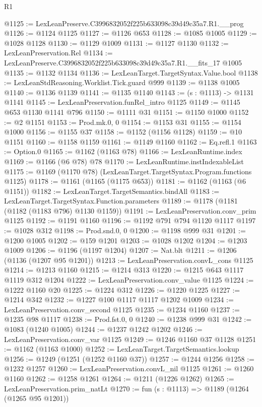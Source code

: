 \begin{lexlean}{R1}
\begin{coremodule}
@1125 := LexLeanPreserve.C3996832052f225b633098c39d49c35a7.R1.__prog
@1126 := @1124 @1125
@1127 := @1126 @653
@1128 := @1085 @1005
@1129 := @1028 @1128
@1130 := @1129 @1009
@1131 := @1127 @1130
@1132 := LexLeanPreservation.Rel
@1134 := LexLeanPreserve.C3996832052f225b633098c39d49c35a7.R1.__fits_17 @1005
@1135 := @1132 @1134
@1136 := LexLeanTarget.TargetSyntax.Value.bool
@1138 := LexLeanStdReasoning.Worklist.Tick.guard @999
@1139 := @1138 @1005
@1140 := @1136 @1139
@1141 := @1135 @1140
@1143 := (s : @1113) -> @1131 @1141
@1145 := LexLeanPreservation.funRel_intro @1125
@1149 := @1145 @653 @1130 @1141 @796
@1150 := @1111 @31
@1151 := @1150 @1000
@1152 := @2 @1151
@1153 := Prod.mk.{0, 0}
@1154 := @1153 @31
@1155 := @1154 @1000
@1156 := @1155 @37
@1158 := @1152 (@1156 @1128)
@1159 := @10 @1151
@1160 := @1158 @1159
@1161 := @1149 @1160
@1162 := Eq.refl.{1}
@1163 := Option.{0}
@1165 := @1162 (@1163 @78)
@1166 := LexLeanRuntime.index
@1169 := @1166 (@6 @78) @78
@1170 := LexLeanRuntime.instIndexableList
@1175 := @1169 (@1170 @78) (LexLeanTarget.TargetSyntax.Program.functions @1125)
@1178 := @1161 (@1165 (@1175 @653))
@1181 := @1162 (@1163 (@6 @1151))
@1182 := LexLeanTarget.TargetSemantics.bindAll
@1183 := LexLeanTarget.TargetSyntax.Function.parameters
@1189 := @1178 (@1181 (@1182 (@1183 @796) @1130 @1159))
@1191 := LexLeanPreservation.conv_prim @1125
@1192 := @1191 @1160
@1196 := @1192 @791 @794 @1120 @1117
@1197 := @1028 @312
@1198 := Prod.snd.{0, 0}
@1200 := @1198 @999 @31
@1201 := @1200 @1005
@1202 := @159 @1201
@1203 := @1028 @1202
@1204 := @1203 @1009
@1206 := @1196 (@1197 @1204)
@1207 := Nat.blt
@1211 := @1206 (@1136 (@1207 @95 @1201))
@1213 := LexLeanPreservation.convL_cons @1125
@1214 := @1213 @1160
@1215 := @1214 @313
@1220 := @1215 @643 @1117 @1119 @312 @1204
@1222 := LexLeanPreservation.conv_value @1125
@1224 := @1222 @1160 @20
@1225 := @1224 @312
@1226 := @1220 @1225
@1227 := @1214 @342
@1232 := @1227 @100 @1117 @1117 @1202 @1009
@1234 := LexLeanPreservation.conv_second @1125
@1235 := @1234 @1160
@1237 := @1235 @98 @1117
@1238 := Prod.fst.{0, 0}
@1240 := @1238 @999 @31
@1242 := @1083 (@1240 @1005)
@1244 := @1237 @1242 @1202
@1246 := LexLeanPreservation.conv_var @1125
@1249 := @1246 @1160 @37 @1128
@1251 := @1162 (@1163 @1000)
@1252 := LexLeanTarget.TargetSemantics.lookup
@1256 := @1249 (@1251 (@1252 @1160 @37))
@1257 := @1244 @1256
@1258 := @1232 @1257
@1260 := LexLeanPreservation.convL_nil @1125
@1261 := @1260 @1160
@1262 := @1258 @1261
@1264 := @1211 (@1226 @1262)
@1265 := LexLeanPreservation.prim_natLt
@1270 := fun (s : @1113) => @1189 (@1264 (@1265 @95 @1201))

\end{coremodule}
\end{lexlean}
